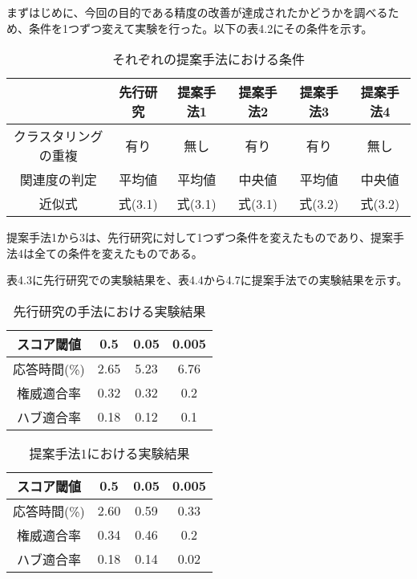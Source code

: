 \documentclass[a4paper,11pt]{jreport}
\begin{document}
まずはじめに、今回の目的である精度の改善が達成されたかどうかを調べるため、条件を1つずつ変えて実験を行った。以下の表4.2にその条件を示す。

\begin{table}[htb]
\begin{center}
\caption{それぞれの提案手法における条件}
\begin{tabular}{|c||c|c|c|c|c|} \hline 
    & 先行研究 & 提案手法1 & 提案手法2 & 提案手法3 & 提案手法4\\ \hline \hline
    クラスタリングの重複 & 有り & 無し & 有り & 有り & 無し \\  \hline
    関連度の判定 & 平均値 & 平均値 & 中央値 & 平均値 & 中央値 \\ \hline
    近似式 & 式(3.1) & 式(3.1) & 式(3.1) & 式(3.2) & 式(3.2) \\ \hline
\end{tabular}
\end{center}
\end{table}

提案手法1から3は、先行研究に対して1つずつ条件を変えたものであり、提案手法4は全ての条件を変えたものである。

表4.3に先行研究での実験結果を、表4.4から4.7に提案手法での実験結果を示す。

\begin{table}[htb]
\begin{center}
\caption{先行研究の手法における実験結果}
\begin{tabular}{|c||c|c|c|} \hline 
    スコア閾値 & 0.5 & 0.05 & 0.005 \\ \hline \hline
    応答時間(\%) & 2.65 & 5.23 & 6.76 \\  \hline
    権威適合率 & 0.32 & 0.32 & 0.2 \\ \hline
    ハブ適合率 & 0.18 & 0.12 & 0.1 \\ \hline
\end{tabular}
\end{center}
\end{table}

\begin{table}[htb]
\begin{center}
\caption{提案手法1における実験結果}
\begin{tabular}{|c||c|c|c|} \hline 
    スコア閾値 & 0.5 & 0.05 & 0.005 \\ \hline \hline
    応答時間(\%) & 2.60 & 0.59 & 0.33 \\  \hline
    権威適合率 & 0.34 & 0.46 & 0.2 \\ \hline
    ハブ適合率 & 0.18 & 0.14 & 0.02 \\ \hline
\end{tabular}
\end{center}
\end{table}
\end{document}
